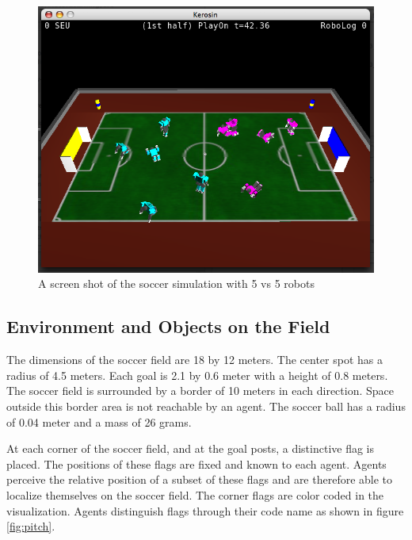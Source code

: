 \begin{figure}[htp]
  \centering
  \includegraphics[width=\textwidth]{fig/soccersim}
  \caption{A screen shot of the soccer simulation with 5 vs 5 robots}
  \label{fig:soccersim}
\end{figure}

\subsection{Environment and Objects on the Field}

The dimensions of the soccer field are 18 by 12 meters. The center
spot has a radius of 4.5 meters. Each goal is 2.1 by 0.6 meter with a
height of 0.8 meters. The soccer field is surrounded by a border of 10
meters in each direction. Space outside this border area is not
reachable by an agent. The soccer ball has a radius of 0.04 meter and a
mass of 26 grams.

At each corner of the soccer field, and at the goal posts, a distinctive
flag is placed. The positions of these flags are fixed and known to
each agent. Agents perceive the relative position of a subset of
these flags and are therefore able to localize themselves on the soccer
field. The corner flags are color coded in the visualization. Agents
distinguish flags through their code name as shown in figure
\ref{fig:pitch}.

